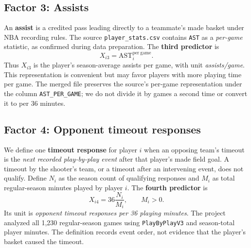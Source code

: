 \documentclass[11pt]{article}
\begin{document}
\subsection{Factor 3: Assists}
An \textbf{assist} is a credited pass leading directly to a teammate's made
basket under NBA recording rules. The source
\texttt{player\_stats.csv} contains \texttt{AST} as a \emph{per-game}
statistic, as confirmed during data preparation. The \textbf{third
predictor} is
\begin{equation}
 \boxed{X_{i3}=\mathrm{AST}^{\mathrm{per\ game}}_i.}
 \label{eq:assists}
\end{equation}
Thus $X_{i3}$ is the player's season-average assists per game, with unit
\emph{assists/game}. This representation is convenient but may favor
players with more playing time per game. The merged file preserves the
source's per-game representation under the column \texttt{AST\_PER\_GAME};
we do not divide it by games a second time or convert it to per 36 minutes.

\subsection{Factor 4: Opponent timeout responses}
We define one \textbf{timeout response} for player $i$ when an opposing
team's timeout is the \emph{next recorded play-by-play event} after that
player's made field goal. A timeout by the shooter's team, or a timeout
after an intervening event, does not qualify. Define $N_i$ as the season
count of qualifying responses and $M_i$ as total regular-season minutes
played by player $i$. The \textbf{fourth predictor} is
\begin{equation}
 \boxed{X_{i4}=36\frac{N_i}{M_i}},\qquad M_i>0.
 \label{eq:timeouts}
\end{equation}
Its unit is \emph{opponent timeout responses per 36 playing minutes}.
The project analyzed all 1,230 regular-season games using
\texttt{PlayByPlayV3} and season-total player minutes. The definition
records event order, not evidence that the player's basket caused the
timeout.
\end{document}
